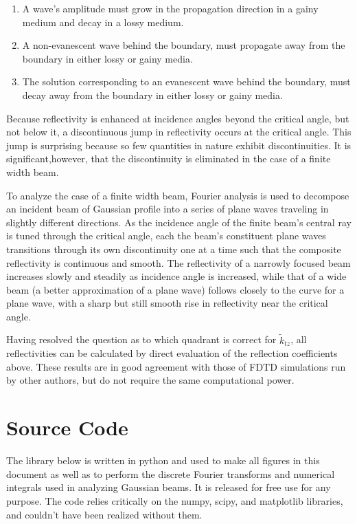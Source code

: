 \documentclass[12pt]{uthesis-v12}
\begin{document}
\begin{enumerate}\label{conditions-conclusions}
\item A wave's amplitude must grow in the propagation direction in a gainy medium and decay in a lossy medium.
\item A non-evanescent wave behind the boundary, must propagate away from the boundary in either lossy or gainy media.
\item The solution corresponding to an evanescent wave behind the boundary, must decay away from the boundary in either lossy or gainy media.
\end{enumerate}

Because reflectivity is enhanced at incidence angles beyond the critical angle, but not below it, a discontinuous jump in reflectivity occurs at the critical angle.  This jump is surprising because so few quantities in nature exhibit discontinuities. It is significant,however, that the discontinuity is eliminated in the case of a finite width beam.

To analyze the case of a finite width beam, Fourier analysis is used to decompose an incident beam of Gaussian profile into a series of plane waves traveling in slightly different directions.  As the incidence angle of the finite beam's central ray is tuned through the critical angle, each the beam's constituent plane waves transitions through its own discontinuity one at a time such that the composite reflectivity is continuous and smooth. The reflectivity of a narrowly focused beam increases slowly and steadily as incidence angle is increased, while that of a wide beam (a better approximation of a plane wave) follows closely to the curve for a plane wave, with a sharp but still smooth rise in reflectivity near the critical angle.

Having resolved the question as to which quadrant is correct for $\tilde{k}_{tz}$, all reflectivities can be calculated by direct evaluation of the reflection coefficients above. These results are in good agreement with those of FDTD simulations run by other authors, but do not require the same computational power.






\appendix
\chapter{Source Code}
The library below is written in python and used to make all figures in this document as well as to perform the discrete Fourier transforms and numerical integrals used in analyzing Gaussian beams. It is released for free use for any purpose.  The code relies critically on the numpy, scipy, and matplotlib libraries, and couldn't have been realized without them.
\vspace{1.5em}
\singlespace


\end{document}
